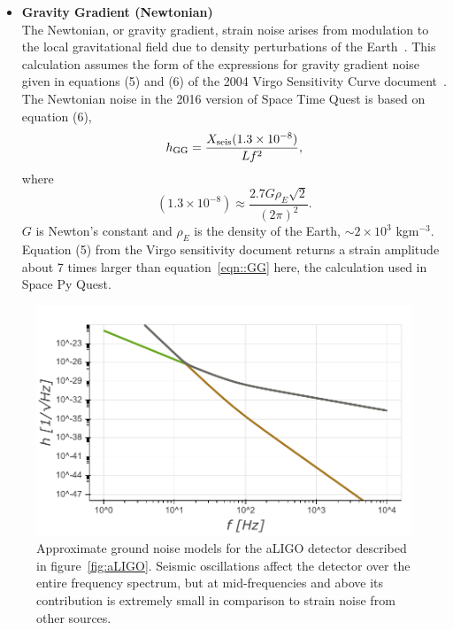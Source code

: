\documentclass{article}
\begin{document}
\begin{itemize}
\begin{equation}
    \end{equation}
    \item \textbf{Gravity Gradient (Newtonian)} \\
    The Newtonian, or gravity gradient, strain noise arises from
    modulation to the local gravitational field due to density
    perturbations of the Earth~\cite{advLIGO}. This calculation
    assumes the form of the expressions for gravity gradient noise
    given in equations (5) and (6) of the 2004 Virgo Sensitivity Curve
    document~\cite{Virgo-sens}. The Newtonian noise in the 2016 version of
    Space Time Quest is based on equation (6),
    \begin{equation}
    \label{eqn::GG}
    h_{\rm GG} = \frac{X_{\rm seis}(1.3\times10^{-8})}{Lf^2},
    \end{equation}
    where
    \begin{equation}
    (1.3\times10^{-8}) \approx \frac{2.7G\rho_E\sqrt{2}}{(2\pi)^2}.
    \end{equation}
   $G$ is Newton's constant and $\rho_E$ is the density of the Earth,
   $\sim 2 \times 10^3$ kgm$^{-3}$. Equation (5) from the Virgo
   sensitivity document returns a strain amplitude about 7 times
   larger than equation~\ref{eqn::GG} here, the calculation used in
   Space Py Quest.
   \end{itemize}
	\begin{figure}[htb]
		\centering
		\includegraphics[height=0.35\textwidth]{SPQ_ground.pdf}
		\caption{Approximate ground noise models for the aLIGO detector
			described in figure~\ref{fig:aLIGO}. Seismic oscillations affect
			the detector over the entire frequency spectrum, but at
			mid-frequencies and above its contribution is extremely small in
			comparison to strain noise from other sources.}
		\label{fig:ground}
	\end{figure}
\end{document}

